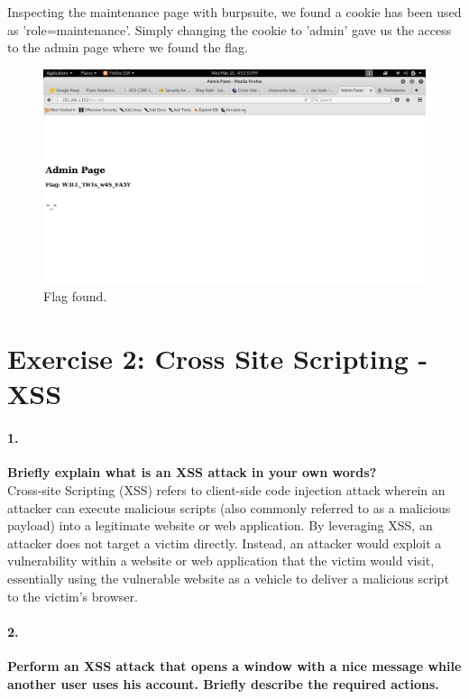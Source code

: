 \documentclass[12pt]{report}
\begin{document}
	Inspecting the maintenance page with burpsuite, we found a cookie has been used as 'role=maintenance'. Simply changing the cookie to 'admin' gave us the access to the admin page where we found the flag.
	\begin{figure}[H]
		\includegraphics[width=0.7\textheight,height=0.4\textheight]{images/1_4admin.jpg}
		\caption{Flag found.}
	\end{figure}
	
	
	\newpage
	
	\section*{Exercise 2: Cross Site Scripting - XSS}
	
	\paragraph*{1.}{\bf Briefly explain what is an XSS attack in your own words?}\\
	
	Cross-site Scripting (XSS) refers to client-side code injection attack wherein an attacker can execute malicious scripts (also commonly referred to as a malicious payload) into a legitimate website or web application.  By leveraging XSS, an attacker does not target a victim directly. Instead, an attacker would exploit a vulnerability within a website or web application that the victim would visit, essentially using the vulnerable website as a vehicle to deliver a malicious script to the victim’s browser.
	
	\paragraph*{2.} {\bf Perform an XSS attack that opens a window with a nice message while another user uses his account. Briefly describe the required actions.}\\
	
\end{document}
